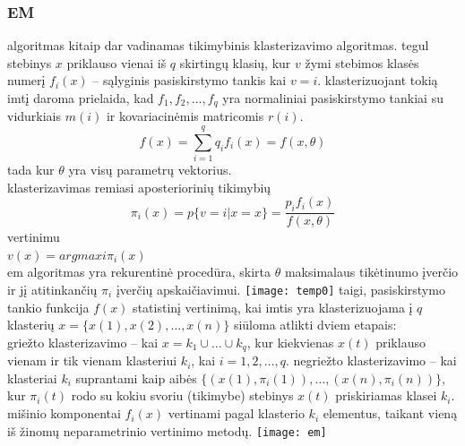 \documentclass{VUMIFInfKursinis}
\begin{document}
		\subsubsection{EM}
			 algoritmas kitaip dar vadinamas tikimybinis klasterizavimo algoritmas.  tegul stebinys $x$ priklauso vienai iš $q$ skirtingų klasių, kur $v$ žymi stebimos klasės numerį $f_i(x)$ – sąlyginis pasiskirstymo tankis kai $v = i$. klasterizuojant tokią imtį daroma prielaida, kad $f_1,f_2,\ldots,f_q$ yra normaliniai pasiskirstymo tankiai su vidurkiais $m(i)$ ir kovariacinėmis matricomis $r(i)$.\\
			\begin{equation}
				f(x)=\sum^q_{i=1} {q_i f_i (x) = f(x, \theta)}
			\end{equation} 
			tada
			kur $\theta$ yra visų parametrų vektorius.\\
			klasterizavimas remiasi aposteriorinių tikimybių
			\begin{equation}
				\pi_i (x) = p\{v = i |x = x\} = \frac{p_i f_i(x)}{f(x,\theta)}
			\end{equation} 
			vertinimu\\
			$v(x) = argmaxi \pi_i(x)$\\
			em algoritmas yra rekurentinė procedūra, skirta $\theta$ maksimalaus tikėtinumo įverčio ir jį atitinkančių $\pi_i$ įverčių apskaičiavimui.
			\texttt{[image: temp0]}
			taigi, pasiskirstymo tankio funkcija $f(x)$ statistinį vertinimą, kai imtis yra klasterizuojama į $q$ klasterių $x = \{x(1), x(2), \ldots, x(n)\}$ siūloma atlikti dviem etapais:\\
			griežto klasterizavimo – kai $x = k_1\cup  \ldots \cup k_q$, kur kiekvienas $x(t)$ priklauso vienam ir tik vienam klasteriui $k_i$, kai $i = 1, 2, \ldots, q$.
			negriežto klasterizavimo – kai klasteriai $k_i$ suprantami kaip aibės $\{(x(1), \pi_i (1)), \ldots, (x(n), \pi_i(n))\}$, kur $\pi_i(t)$ rodo su kokiu svoriu (tikimybe) stebinys $x(t)$ priskiriamas klasei $k_i$. mišinio komponentai $f_i(x)$ vertinami pagal klasterio $k_i$ elementus, taikant vieną iš žinomų neparametrinio vertinimo metodų.
			\texttt{[image: em]}
\end{document}
